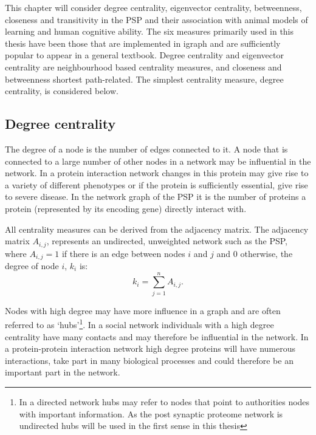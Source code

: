 This chapter will consider degree centrality, eigenvector centrality, betweenness, closeness and transitivity in the PSP and their association with animal models of learning and human cognitive ability. The six measures primarily used in this thesis have been those that are implemented in igraph and are sufficiently popular to appear in a general textbook\cite{newman2018networks}. Degree centrality and eigenvector centrality are neighbourhood based centrality measures, and closeness and betweenness shortest path-related\cite{kardos2020stability}. The simplest centrality measure, degree centrality, \cite{newman2018networks} is considered below. 

\subsection{Degree centrality}
\label{sec:degree centrality}

The degree of a node is the number of edges connected to it. A node that is connected to a large number of other nodes in a network may be influential in the network. In a protein interaction network changes in this protein may give rise to a variety of different phenotypes or if the protein is sufficiently essential, give rise to severe disease.  In the network graph of the PSP it is the number of proteins a protein (represented by its encoding gene) directly interact with.


All centrality measures can be derived from the adjacency matrix. The adjacency matrix $A_{i,j}$, represents an undirected, unweighted network such as the PSP,  where $A_{i,j}=1$  if there is an edge between nodes $i$ and $j$ and 0 otherwise, the degree of node $i$, $k_i$ is\cite{boccaletti2006complex}:
\begin{equation}
k_i = \sum_{j=1}^n A_{i,j}.
\label{Equation:Degree_from_adjacency}
\end{equation}

 Nodes with high degree may have more influence in a graph and are often referred to as `hubs'\cite{zhu2007getting}\footnote{In a directed network hubs may refer to nodes that point to authorities nodes with important information. As the post synaptic proteome network is undirected hubs will be used in the first sense in this thesis\cite{kleinberg1999authoritative}}.  In a social network individuals with a high degree centrality have many contacts and may therefore be influential in the network. In a protein-protein interaction network high degree proteins will have numerous interactions, take part in many biological processes and could therefore be an important part in the network. 
 
